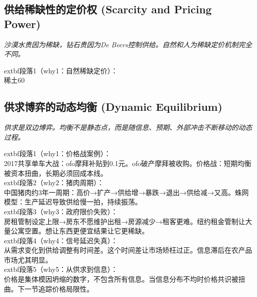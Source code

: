 \documentclass[openany, a4paper, 12pt]{book}
\newenvironment{motivation}{
	\vspace{0.5em}
	\begin{tcolorbox}[
		colback=gray!10,           %
		colframe=gray!60,          %
		title=\textit{本章动机 (Motivation)},
		fonttitle=\bfseries,
		arc=0mm,                   %
		leftrule=3mm               %
		]
		\small \itshape %
	}{
	\end{tcolorbox}
	\vspace{1em}
}
\begin{document}
	\subsection{供给稀缺性的定价权 (Scarcity and Pricing Power)}
	\begin{motivation}沙漠水贵因为稀缺，钻石贵因为De Beers控制供给。自然和人为稀缺定价机制完全不同。\end{motivation}
		extbf{段落1（why1：自然稀缺定价）}：\\稀土60%

	\subsection{供求博弈的动态均衡 (Dynamic Equilibrium)}
	\begin{motivation}供求是双边博弈。均衡不是静态点，而是随信息、预期、外部冲击不断移动的动态过程。\end{motivation}
		extbf{段落1（why1：价格战案例）}：\\2017共享单车大战：ofo摩拜补贴到0.1元。ofo破产摩拜被收购。价格战：短期均衡被资本扭曲，长期必须回成本线。\\	extbf{段落2（why2：猪肉周期）}：\\中国猪肉约3年一周期：高价→扩产→供给增→暴跌→退出→供给减→又高。蛛网模型：生产延迟导致供给慢一拍，持续振荡。\\	extbf{段落3（why3：政府限价失败）}：\\房租管制设定上限→房东不愿维护出租→房源减少→租客更难。纽约租金管制让大量公寓空置。想让东西更便宜结果让它更稀缺。\\	extbf{段落4（why4：信号延迟失真）}：\\从需求变化到供给调整有时间差。这个时间差让市场矫枉过正。信息滞后在农产品市场尤其明显。\\	extbf{段落5（why5：从供求到信息）}：\\价格是集体模因坍缩的数字，不包含所有信息。当信息分布不均时价格共识被扭曲。下一节追踪价格局限性。
\end{document}
